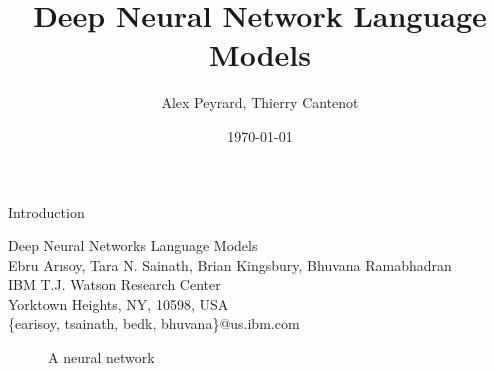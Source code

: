 \documentclass{beamer}
\title[DNNLM]{Deep Neural Network Language Models}
\author[A. Peyrard, T. Cantenot]{Alex Peyrard, Thierry Cantenot}
\institute{Shanghai JiaoTong University}
\date{\today}
\begin{document}
\begin{frame}[plain]
	  \titlepage
\end{frame}
\begin{frame}{Introduction}
\begin{center}
Deep Neural Networks Language Models\\
Ebru Arısoy, Tara N. Sainath, Brian Kingsbury, Bhuvana Ramabhadran\\
IBM T.J. Watson Research Center\\
Yorktown Heights, NY, 10598, USA\\
\{earisoy, tsainath, bedk, bhuvana\}@us.ibm.com
\end{center}

\end{frame}
\begin{frame}
\begin{figure}[!ht]
	\centering
	\rule{0cm}{0cm}
	
	\caption{A neural network}
\end{figure}
\end{frame}
\end{document}
